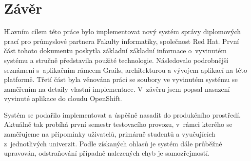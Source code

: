 \chapter{Závěr}
Hlavním cílem této práce bylo implementovat nový systém správy diplomových prací pro průmyslové partnera Fakulty informatiky, společnost Red Hat. První část tohoto dokumentu poskytla základní základní informace o~vyvinutém systému a stručně představila použité technologie. Následovalo podrobnější seznámení s~aplikačním rámcem Grails, architekturou a vývojem aplikací na této platformě. Třetí část byla věnována práci se soubory ve vyvinutém systému se zaměřením na detaily vlastní implementace. V~závěru jsem popsal nasazení vyvinuté aplikace do cloudu OpenShift.

Systém se podařilo implementovat a úspěšně nasadit do produkčního prostředí. Aktuálně tak probíhá první semestr testovacího provozu, v~rámci kterého se zaměřujeme na připomínky uživatelů, primárně studentů a vyučujících z~jednotlivých univerzit. Podle získaných ohlasů je systém dále průběžné upravován, odstraňování případně nalezených chyb je samozřejmostí.
